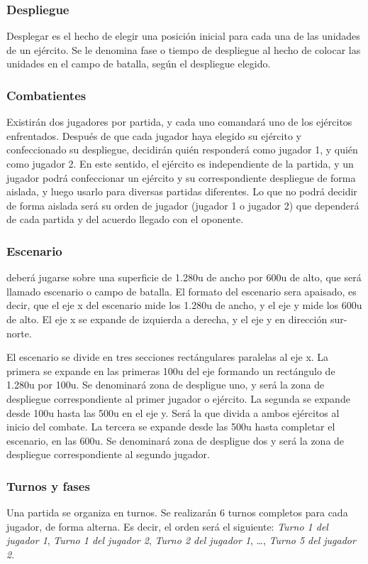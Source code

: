 \subsubsection*{Despliegue}
Desplegar es el hecho de elegir una posición inicial para cada una de
las unidades de un ejército. Se le denomina fase o tiempo de
despliegue al hecho de colocar las unidades en el campo de batalla,
según el despliegue elegido.

\subsubsection*{Combatientes}
Existirán dos jugadores por partida, y cada uno comandará uno de los
ejércitos enfrentados. Después de que cada jugador haya elegido su
ejército y confeccionado su despliegue, decidirán quién responderá
como jugador 1, y quién como jugador 2. En este sentido, el ejército
es independiente de la partida, y un jugador podrá confeccionar un
ejército y su correspondiente despliegue de forma aislada, y luego
usarlo para diversas partidas diferentes. Lo que no podrá decidir de
forma aislada será su orden de jugador (jugador 1 o jugador 2) que
dependerá de cada partida y del acuerdo llegado con el oponente. 

\subsubsection*{Escenario}
\gom deberá jugarse sobre una superficie de 1.280u de ancho por 600u
de alto, que será llamado escenario o campo de batalla. El formato del
escenario sera apaisado, es decir, que el eje x del escenario mide los
1.280u de ancho, y el eje y mide los 600u de alto. El eje x se expande
de izquierda a derecha, y el eje y en dirección sur-norte.

El escenario se divide en tres secciones rectángulares paralelas al
eje x. La primera se expande en las primeras 100u del eje formando
un rectángulo de 1.280u por 100u. Se denominará zona de despligue
uno, y será la zona de despliegue correspondiente al primer jugador o
ejército. La segunda se expande desde 100u hasta las 500u en el eje y. Será
la que divida a ambos ejércitos al inicio del combate. La tercera se
expande desde las 500u hasta completar el escenario, en las 600u. Se
denominará zona de despligue dos y será la zona de despliegue
correspondiente al segundo jugador.

\subsubsection*{Turnos y fases}
Una partida se organiza en turnos. Se realizarán 6 turnos completos
para cada jugador, de forma alterna. Es decir, el orden será el
siguiente: \textit{Turno 1 del jugador 1}, \textit{Turno 1 del jugador
  2}, \textit{Turno 2 del jugador 1}, \ldots, \textit{Turno 5 del
  jugador 2}.

